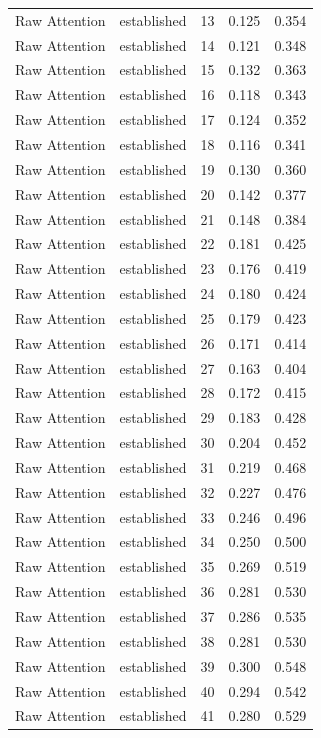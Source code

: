 \begin{tabular}{llrrr}
Raw Attention & established & 13 & 0.125 & 0.354 \\
Raw Attention & established & 14 & 0.121 & 0.348 \\
Raw Attention & established & 15 & 0.132 & 0.363 \\
Raw Attention & established & 16 & 0.118 & 0.343 \\
Raw Attention & established & 17 & 0.124 & 0.352 \\
Raw Attention & established & 18 & 0.116 & 0.341 \\
Raw Attention & established & 19 & 0.130 & 0.360 \\
Raw Attention & established & 20 & 0.142 & 0.377 \\
Raw Attention & established & 21 & 0.148 & 0.384 \\
Raw Attention & established & 22 & 0.181 & 0.425 \\
Raw Attention & established & 23 & 0.176 & 0.419 \\
Raw Attention & established & 24 & 0.180 & 0.424 \\
Raw Attention & established & 25 & 0.179 & 0.423 \\
Raw Attention & established & 26 & 0.171 & 0.414 \\
Raw Attention & established & 27 & 0.163 & 0.404 \\
Raw Attention & established & 28 & 0.172 & 0.415 \\
Raw Attention & established & 29 & 0.183 & 0.428 \\
Raw Attention & established & 30 & 0.204 & 0.452 \\
Raw Attention & established & 31 & 0.219 & 0.468 \\
Raw Attention & established & 32 & 0.227 & 0.476 \\
Raw Attention & established & 33 & 0.246 & 0.496 \\
Raw Attention & established & 34 & 0.250 & 0.500 \\
Raw Attention & established & 35 & 0.269 & 0.519 \\
Raw Attention & established & 36 & 0.281 & 0.530 \\
Raw Attention & established & 37 & 0.286 & 0.535 \\
Raw Attention & established & 38 & 0.281 & 0.530 \\
Raw Attention & established & 39 & 0.300 & 0.548 \\
Raw Attention & established & 40 & 0.294 & 0.542 \\
Raw Attention & established & 41 & 0.280 & 0.529 \\

\end{tabular}
